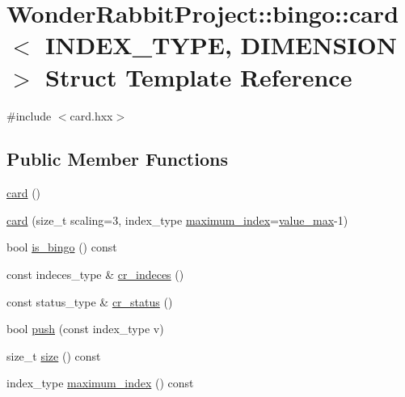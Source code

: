 \hypertarget{structWonderRabbitProject_1_1bingo_1_1card}{\section{Wonder\-Rabbit\-Project\-:\-:bingo\-:\-:card$<$ I\-N\-D\-E\-X\-\_\-\-T\-Y\-P\-E, D\-I\-M\-E\-N\-S\-I\-O\-N $>$ Struct Template Reference}
\label{structWonderRabbitProject_1_1bingo_1_1card}
}


{\ttfamily \#include $<$card.\-hxx$>$}

\subsection*{Public Member Functions}
\begin{DoxyCompactItemize}
\item 
\hyperlink{structWonderRabbitProject_1_1bingo_1_1card_afc196ced3e34ff408eb6b04c1107d73e}{card} ()
\item 
\hyperlink{structWonderRabbitProject_1_1bingo_1_1card_a5698a803396378eafde84491d4650645}{card} (size\-\_\-t scaling=3, index\-\_\-type \hyperlink{structWonderRabbitProject_1_1bingo_1_1card_a06c4ff791538bbf4f27f73a3bb2a1571}{maximum\-\_\-index}=\hyperlink{structWonderRabbitProject_1_1bingo_1_1card_a5409fd54b41693dd89b811ffaef710b2}{value\-\_\-max}-\/1)
\item 
bool \hyperlink{structWonderRabbitProject_1_1bingo_1_1card_a8039e8b858bbcc206b1decd781e68798}{is\-\_\-bingo} () const 
\item 
const indeces\-\_\-type \& \hyperlink{structWonderRabbitProject_1_1bingo_1_1card_a2fb50514cdbca6d8868830ebda380d5b}{cr\-\_\-indeces} ()
\item 
const status\-\_\-type \& \hyperlink{structWonderRabbitProject_1_1bingo_1_1card_a9ef3180a051e0623fcd3fabcf0d9a5b1}{cr\-\_\-status} ()
\item 
bool \hyperlink{structWonderRabbitProject_1_1bingo_1_1card_abc7f46f16bf63ac7066807e9cc0725b6}{push} (const index\-\_\-type v)
\item 
size\-\_\-t \hyperlink{structWonderRabbitProject_1_1bingo_1_1card_a371a1176a06fab884c5fa2c72829edba}{size} () const 
\item 
index\-\_\-type \hyperlink{structWonderRabbitProject_1_1bingo_1_1card_a06c4ff791538bbf4f27f73a3bb2a1571}{maximum\-\_\-index} () const 
\end{DoxyCompactItemize}
